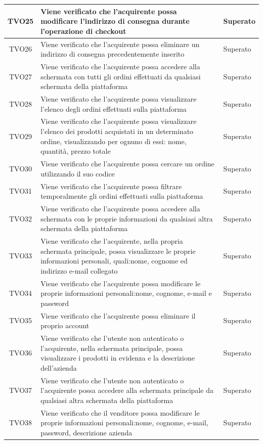 \begin{longtable}{|c| C{10cm} |C{3cm}|}
	TVO25 & Viene verificato che l'acquirente possa modificare l'indirizzo di consegna durante l'operazione di checkout & Superato\\ \hline
	TVO26 & Viene verificato che l'acquirente possa eliminare un indirizzo di consegna precedentemente inserito & Superato\\ \hline
	TVO27 & Viene verificato che l'acquirente possa accedere alla schermata con tutti gli ordini effettuati da qualsiasi schermata della piattaforma & Superato \\ \hline
	TVO28 & Viene verificato che l'acquirente possa visualizzare l'elenco degli ordini effettuati sulla piattaforma & Superato\\ \hline
	TVO29 & Viene verificato che l'acquirente possa visualizzare l'elenco dei prodotti acquistati in un determinato ordine, visualizzando per ognuno di essi: nome, quantità, prezzo totale & Superato\\ \hline
	TVO30 & Viene verificato che l'acquirente possa cercare un ordine utilizzando il suo codice & Superato\\ \hline
	TVO31 & Viene verificato che l'acquirente possa filtrare temporalmente gli ordini effettuati sulla piattaforma & Superato\\ \hline
	TVO32 & Viene verificato che l'acquirente possa accedere alla schermata con le proprie informazioni da qualsiasi altra schermata della piattaforma & Superato\\ \hline
	TVO33 & Viene verificato che l'acquirente, nella propria schermata principale, possa visualizzare le proprie informazioni personali, quali:nome, cognome ed indirizzo e-mail collegato & Superato\\ \hline
	TVO34 & Viene verificato che l'acquirente possa modificare le proprie informazioni personali:nome, cognome, e-mail e password & Superato\\ \hline
	TVO35 & Viene verificato che l'acquirente possa eliminare il proprio account & Superato\\ \hline
	TVO36 & Viene verificato che l'utente non autenticato o l'acquirente, nella schermata principale, possa visualizzare i prodotti in evidenza e la descrizione dell'azienda & Superato\\ \hline
	TVO37 & Viene verificato che l'utente non autenticato o l'acquirente possa accedere alla schermata principale da qualsiasi altra schermata della piattaforma & Superato\\ \hline
	TVO38 & Viene verificato che il venditore possa modificare le proprie informazioni personali:nome, cognome, e-mail, password, descrizione azienda & Superato\\ \hline

\end{longtable}
